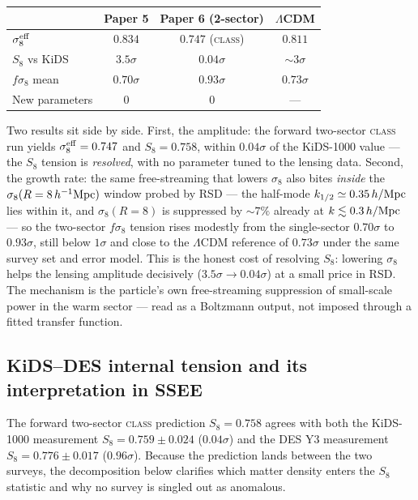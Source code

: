\documentclass[12pt,a4paper]{article}
\newcommand{\SSEE}{\textsc{SSEE}}
\newcommand{\fsig}{f\sigma_8}
\newcommand{\sigeff}{\sigma_8^{\rm eff}}
\begin{document}
\begin{center}
\begin{tabular}{lccc}
  \toprule
  & Paper 5 & Paper 6 (2-sector) & $\Lambda$CDM \\
  \midrule
  $\sigeff$ & $0.834$ & $0.747$ (\textsc{class}) & $0.811$ \\
  $S_8$ vs KiDS & $3.5\sigma$ & $0.04\sigma$ & $\sim3\sigma$ \\
  $\fsig$ mean & $0.70\sigma$ & $0.93\sigma$ & $0.73\sigma$ \\
  New parameters & 0 & 0 & — \\
  \bottomrule
\end{tabular}
\end{center}

\noindent
Two results sit side by side. First, the amplitude: the forward two-sector
\textsc{class} run yields $\sigeff = 0.747$ and $S_8 = 0.758$, within
$0.04\sigma$ of the KiDS-1000 value --- the $S_8$ tension is \emph{resolved},
with no parameter tuned to the lensing data. Second, the growth rate: the same
free-streaming that lowers $\sigma_8$ also bites \emph{inside} the $\sigma_8(R=8\,h^{-1}{\rm Mpc})$
window probed by RSD --- the half-mode $k_{1/2}\simeq0.35\,h/{\rm Mpc}$ lies within it,
and $\sigma_8(R{=}8)$ is suppressed by $\sim7\%$ already at $k\lesssim0.3\,h/{\rm Mpc}$ ---
so the two-sector $f\sigma_8$ tension rises modestly from the single-sector
$0.70\sigma$ to $0.93\sigma$, still below $1\sigma$ and close to the
$\Lambda$CDM reference of $0.73\sigma$ under the same survey set and error model.
This is the honest cost of resolving $S_8$: lowering $\sigma_8$ helps the lensing
amplitude decisively ($3.5\sigma\!\to\!0.04\sigma$) at a small price in RSD. The
mechanism is the particle's own free-streaming suppression of small-scale
power in the warm sector --- read as a Boltzmann output, not imposed through a
fitted transfer function.

\subsection{KiDS--DES internal tension and its interpretation in \SSEE}
\label{subsec:des}

The forward two-sector \textsc{class} prediction $S_8 = 0.758$ agrees with both
the KiDS-1000 measurement $S_8 = 0.759 \pm 0.024$ \citep{KiDS2021}
($0.04\sigma$) and the DES Y3 measurement $S_8 = 0.776 \pm 0.017$
\citep{DESY32022} ($0.96\sigma$). Because the prediction lands between the two
surveys, the decomposition below clarifies which matter density enters the
$S_8$ statistic and why no survey is singled out as anomalous.
\end{document}
